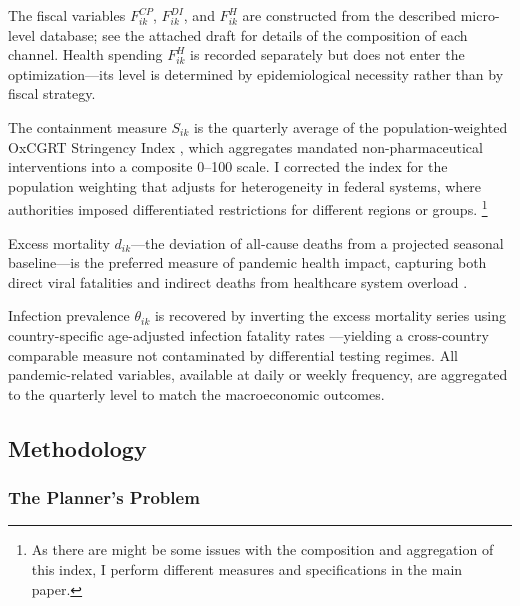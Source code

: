 \documentclass[12pt, a4paper]{article}
\begin{document}
The fiscal variables $F_{ik}^{CP}$, $F_{ik}^{DI}$, and $F_{ik}^{H}$ are constructed from the described micro-level database; see the attached draft for details of the composition of
each channel. Health spending $F_{ik}^{H}$ is recorded separately but does not enter the optimization---its level is determined by epidemiological necessity rather than by fiscal strategy. 

The containment measure $S_{ik}$ is the quarterly average of the population-weighted OxCGRT Stringency Index \citep{Hale2021}, which aggregates mandated non-pharmaceutical interventions into a composite 0--100 scale. I corrected the index for the population weighting that adjusts for heterogeneity in federal systems, where authorities imposed differentiated restrictions for different regions or groups. \footnote{As there are might be some issues with the composition and aggregation of this index, I perform different measures and specifications in the main paper.} 

Excess mortality $d_{ik}$---the deviation of all-cause deaths from a projected seasonal baseline---is the preferred measure of pandemic health impact, capturing both direct viral fatalities and indirect deaths from healthcare system overload \citep{Msemburi2023WHO, owid_em}. 

Infection prevalence $\theta_{ik}$ is recovered by inverting the excess mortality series using country-specific age-adjusted infection fatality rates \citep{Levin2020, COVID19ForecastingTeam2022}---yielding a cross-country comparable measure not contaminated by differential testing regimes. All pandemic-related variables, available at daily or weekly frequency, are aggregated to the quarterly level to match the macroeconomic outcomes.

\subsection{Methodology}

\subsubsection{The Planner's Problem}
\end{document}
